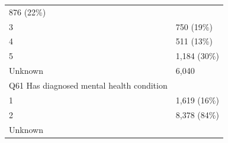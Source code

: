 \documentclass[]{article}
\begin{document}
\begin{longtable}[]{@{}ll@{}}
\begin{minipage}[t]{0.23\columnwidth}
876 (22\%)\strut
\end{minipage}\tabularnewline
\begin{minipage}[t]{0.71\columnwidth}\raggedright
3\strut
\end{minipage} & \begin{minipage}[t]{0.23\columnwidth}\raggedright
750 (19\%)\strut
\end{minipage}\tabularnewline
\begin{minipage}[t]{0.71\columnwidth}\raggedright
4\strut
\end{minipage} & \begin{minipage}[t]{0.23\columnwidth}\raggedright
511 (13\%)\strut
\end{minipage}\tabularnewline
\begin{minipage}[t]{0.71\columnwidth}\raggedright
5\strut
\end{minipage} & \begin{minipage}[t]{0.23\columnwidth}\raggedright
1,184 (30\%)\strut
\end{minipage}\tabularnewline
\begin{minipage}[t]{0.71\columnwidth}\raggedright
Unknown\strut
\end{minipage} & \begin{minipage}[t]{0.23\columnwidth}\raggedright
6,040\strut
\end{minipage}\tabularnewline
\begin{minipage}[t]{0.71\columnwidth}\raggedright
Q61 Has diagnosed mental health condition\strut
\end{minipage} & \begin{minipage}[t]{0.23\columnwidth}\raggedright
\strut
\end{minipage}\tabularnewline
\begin{minipage}[t]{0.71\columnwidth}\raggedright
1\strut
\end{minipage} & \begin{minipage}[t]{0.23\columnwidth}\raggedright
1,619 (16\%)\strut
\end{minipage}\tabularnewline
\begin{minipage}[t]{0.71\columnwidth}\raggedright
2\strut
\end{minipage} & \begin{minipage}[t]{0.23\columnwidth}\raggedright
8,378 (84\%)\strut
\end{minipage}\tabularnewline
\begin{minipage}[t]{0.71\columnwidth}\raggedright
Unknown\strut
\end{minipage} & \begin{minipage}[t]{0.23\columnwidth}\raggedright

\end{minipage}
\end{longtable}
\end{document}

